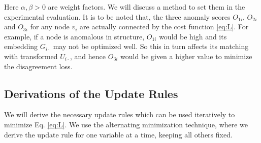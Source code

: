 \documentclass[letterpaper]{article} %
\begin{document}
Here $\alpha, \beta > 0$ are weight factors. We will discuss a method to set them in the experimental evaluation. It is to be noted that, the three anomaly scores $O_{1i}$, $O_{2i}$ and $O_{3i}$ for any node $v_i$ are actually connected by the cost function \ref{eq:L}. For example, if a node is anomalous in structure, $O_{1i}$ would be high and its embedding $G_{i\cdot}$ may not be optimized well. So this in turn affects its matching with transformed $U_{i\cdot}$, and hence $O_{3i}$ would be given a higher value to minimize the disagreement loss.


\subsection{Derivations of the Update Rules}
We will derive the necessary update rules which can be used iteratively to minimize Eq. \ref{eq:L}.
We use the alternating minimization technique, where we derive the update rule for one variable at a time, keeping all others fixed.
\end{document}
